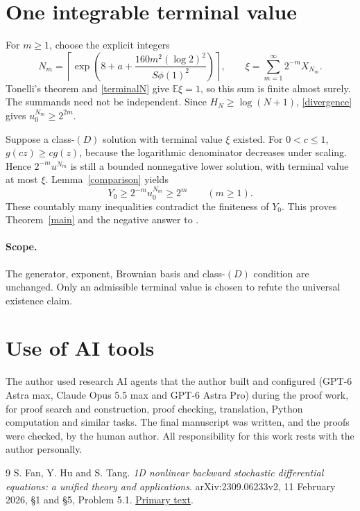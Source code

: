 \documentclass[11pt]{article}
\newcommand{\E}{\mathbb E}
\begin{document}
\section*{One integrable terminal value}
For $m\geq1$, choose the explicit integers
\[
 N_m=\left\lceil\exp\left(8+a+
        \frac{160m^2(\log2)^2}{S\phi(1)^2}\right)\right\rceil,
 \qquad
 \xi=\sum_{m=1}^{\infty}2^{-m}X_{N_m}.
\]
Tonelli's theorem and \eqref{terminalN} give $\E\xi=1$, so this sum
is finite almost surely. The summands need not be independent.
Since $H_N\geq\log(N+1)$, \eqref{divergence} gives
$u^{N_m}_0\geq2^{2m}$.

Suppose a class-$(D)$ solution with terminal value $\xi$ existed.
For $0<c\leq1$, $g(cz)\geq c g(z)$, because the logarithmic denominator
decreases under scaling. Hence $2^{-m}u^{N_m}$ is still a bounded
nonnegative lower solution, with terminal value at most $\xi$.
Lemma~\ref{comparison} yields
\[
 Y_0\geq2^{-m}u^{N_m}_0\geq2^m\qquad(m\geq1).
\]
These countably many inequalities contradict the finiteness of $Y_0$.
This proves Theorem~\ref{main} and the negative answer to
\cite[Problem 5.1, equation (5.1)]{FHT}.

\paragraph{Scope.}
The generator, exponent, Brownian basis and class-$(D)$ condition are
unchanged. Only an admissible terminal value is chosen to refute the
universal existence claim.

\section*{Use of AI tools}
The author used research AI agents that the author built and configured (GPT-6 Astra max,
Claude Opus 5.5 max and GPT-6 Astra Pro) during the proof work, for proof search and
construction, proof checking, translation, Python computation and similar tasks. The final
manuscript was written, and the proofs were checked, by the human author. All responsibility
for this work rests with the author personally.

\begin{thebibliography}{9}
S. Fan, Y. Hu and S. Tang.
\emph{1D nonlinear backward stochastic differential equations:
a unified theory and applications}.
arXiv:2309.06233v2, 11 February 2026, \S1 and \S5, Problem 5.1.
\href{https://arxiv.org/html/2309.06233v2#S5}{Primary text}.
\end{thebibliography}
\end{document}
